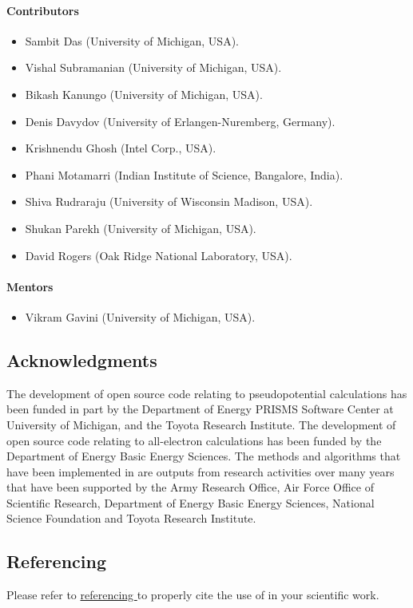 \paragraph{Contributors}
\begin{itemize}
	\item Sambit Das (University of Michigan, USA).
	\item Vishal Subramanian (University of Michigan, USA).
	\item Bikash Kanungo (University of Michigan, USA).
	\item Denis Davydov (University of Erlangen-Nuremberg, Germany).
	\item Krishnendu Ghosh (Intel Corp., USA).
	\item Phani Motamarri (Indian Institute of Science, Bangalore, India).
	\item Shiva Rudraraju (University of Wisconsin Madison, USA).
	\item Shukan Parekh (University of Michigan, USA). 	
	\item David Rogers (Oak Ridge National Laboratory, USA).
\end{itemize}

\paragraph{Mentors}
\begin{itemize}
	\item Vikram Gavini (University of Michigan, USA).
\end{itemize}

\subsection{Acknowledgments}
The development of \dftfe{} open source code relating to pseudopotential calculations has been funded in part by the Department 
of Energy PRISMS Software Center at University of Michigan, and the Toyota Research Institute. The development of \dftfe{} open 
source code relating to all-electron calculations has been funded by the Department of Energy Basic Energy Sciences. The methods 
and algorithms that have been implemented in \dftfe{} are outputs from research activities over many years that have been 
supported by the Army Research Office, Air Force Office of Scientific Research, Department of Energy Basic Energy Sciences, 
National Science Foundation and Toyota Research Institute. 

\subsection{Referencing \dftfe{}}
Please refer to \href{https://sites.google.com/umich.edu/dftfe/referencing}{referencing  \dftfe{}} to properly cite the use of 
\dftfe{} in your scientific work. 

